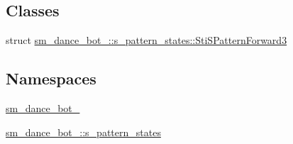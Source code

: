 \subsection*{Classes}
\begin{DoxyCompactItemize}
\item 
struct \hyperlink{structsm__dance__bot__2_1_1s__pattern__states_1_1StiSPatternForward3}{sm\+\_\+dance\+\_\+bot\+\_\+::s\+\_\+pattern\+\_\+states\+::\+Sti\+S\+Pattern\+Forward3}
\end{DoxyCompactItemize}
\subsection*{Namespaces}
\begin{DoxyCompactItemize}
\item 
 \hyperlink{namespacesm__dance__bot__2}{sm\+\_\+dance\+\_\+bot\+\_}
\item 
 \hyperlink{namespacesm__dance__bot__2_1_1s__pattern__states}{sm\+\_\+dance\+\_\+bot\+\_\+::s\+\_\+pattern\+\_\+states}
\end{DoxyCompactItemize}

